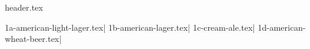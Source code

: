 \clearpage
{}
\divisorLine

{header.tex}

\begin{multicols}{2}

{1a-american-light-lager.tex}|
{1b-american-lager.tex}|
{1c-cream-ale.tex}|
{1d-american-wheat-beer.tex}|

\end{multicols}
